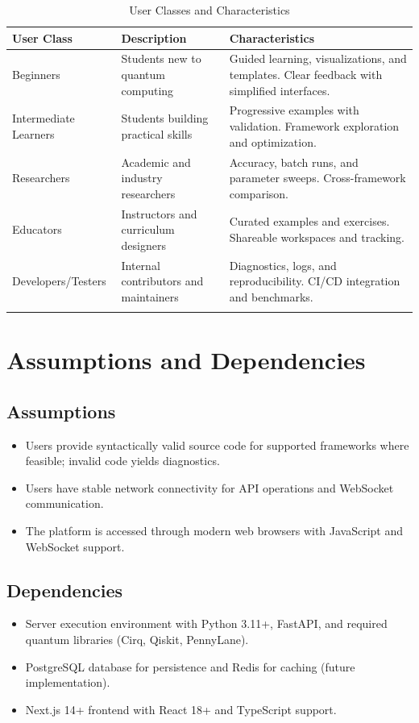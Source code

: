 \begin{longtable}{p{} p{} p{}}
\toprule
\textbf{User Class} & \textbf{Description} & \textbf{Characteristics} \\
\midrule
\endhead

Beginners & Students new to quantum computing & Guided learning, visualizations, and templates. Clear feedback with simplified interfaces. \\
\midrule

Intermediate Learners & Students building practical skills & Progressive examples with validation. Framework exploration and optimization. \\
\midrule

Researchers & Academic and industry researchers & Accuracy, batch runs, and parameter sweeps. Cross-framework comparison. \\
\midrule

Educators & Instructors and curriculum designers & Curated examples and exercises. Shareable workspaces and tracking. \\
\midrule

Developers/Testers & Internal contributors and maintainers & Diagnostics, logs, and reproducibility. CI/CD integration and benchmarks. \\
\bottomrule
\caption{User Classes and Characteristics}
\label{tab:user_classes}
\end{longtable}

\section{Assumptions and Dependencies}

\subsection{Assumptions}
\begin{itemize}
    \item Users provide syntactically valid source code for supported frameworks where feasible; invalid code yields diagnostics.
    \item Users have stable network connectivity for API operations and WebSocket communication.
    \item The platform is accessed through modern web browsers with JavaScript and WebSocket support.
\end{itemize}

\subsection{Dependencies}
\begin{itemize}
    \item Server execution environment with Python 3.11+, FastAPI, and required quantum libraries (Cirq, Qiskit, PennyLane).
    \item PostgreSQL database for persistence and Redis for caching (future implementation).
    \item Next.js 14+ frontend with React 18+ and TypeScript support.
\end{itemize}

